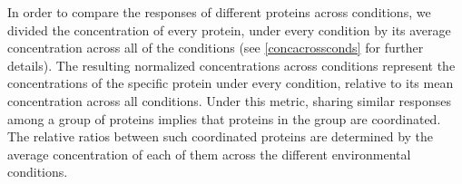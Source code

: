 In order to compare the responses of different proteins across conditions, we divided the concentration of every protein, under every condition by its average concentration across all of the conditions (see \ref{concacrossconds} for further details).
The resulting normalized concentrations across conditions represent the concentrations of the specific protein under every condition, relative to its mean concentration across all conditions.
Under this metric, sharing similar responses among a group of proteins implies that proteins in the group are coordinated.
The relative ratios between such coordinated proteins are determined by the average concentration of each of them across the different environmental conditions.
